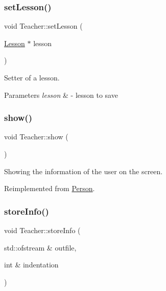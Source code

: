 \subsubsection{\texorpdfstring{set\+Lesson()}{setLesson()}}
{\footnotesize\ttfamily void Teacher\+::set\+Lesson (\begin{DoxyParamCaption}\item[{\mbox{\hyperlink{class_lesson}{Lesson}} $\ast$}]{lesson }\end{DoxyParamCaption})}



Setter of a lesson. 


\begin{DoxyParams}{Parameters}
{\em lesson} & -\/ lesson to save \\
\hline
\end{DoxyParams}
\mbox{\label{class_teacher_a3045744c4ef7e1189caac2ae9a126254}} 
\subsubsection{\texorpdfstring{show()}{show()}}
{\footnotesize\ttfamily void Teacher\+::show (\begin{DoxyParamCaption}{ }\end{DoxyParamCaption})\hspace{0.3cm}{\ttfamily [virtual]}}



Showing the information of the user on the screen. 



Reimplemented from \mbox{\hyperlink{class_person_a2f1231629a6e7e8c83ada57628e80a89}{Person}}.

\mbox{\label{class_teacher_a2ece0d60fa7ec4aaf93333aa0be0d25f}} 
\subsubsection{\texorpdfstring{store\+Info()}{storeInfo()}}
{\footnotesize\ttfamily void Teacher\+::store\+Info (\begin{DoxyParamCaption}\item[{std\+::ofstream \&}]{outfile,  }\item[{int \&}]{indentation }\end{DoxyParamCaption})\hspace{0.3cm}{\ttfamily [virtual]}}



